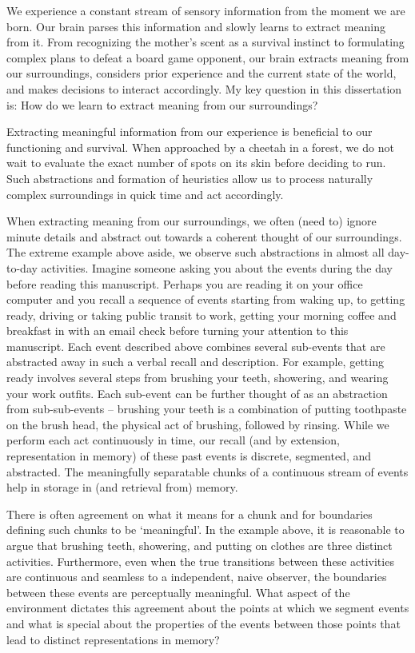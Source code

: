 We experience a constant stream of sensory information from the moment we are born. Our brain parses this information and slowly learns to extract meaning from it. From recognizing the mother's scent as a survival instinct to formulating complex plans to defeat a board game opponent, our brain extracts meaning from our surroundings, considers prior experience and the current state of the world, and makes decisions to interact accordingly. My key question in this dissertation is: How do we learn to extract meaning from our surroundings?

Extracting meaningful information from our experience is beneficial to our functioning and survival. When approached by a cheetah in a forest, we do not wait to evaluate the exact number of spots on its skin before deciding to run. Such abstractions and formation of heuristics allow us to process naturally complex surroundings in quick time and act accordingly.

When extracting meaning from our surroundings, we often (need to) ignore minute details and abstract out towards a coherent thought of our surroundings. The extreme example above aside, we observe such abstractions in almost all day-to-day activities. Imagine someone asking you about the events during the day before reading this manuscript. Perhaps you are reading it on your office computer and you recall a sequence of events starting from waking up, to getting ready, driving or taking public transit to work, getting your morning coffee and breakfast in with an email check before turning your attention to this manuscript. Each event described above combines several sub-events that are abstracted away in such a verbal recall and description. For example, getting ready involves several steps from brushing your teeth, showering, and wearing your work outfits. Each sub-event can be further thought of as an abstraction from sub-sub-events -- brushing your teeth is a combination of putting toothpaste on the brush head, the physical act of brushing, followed by rinsing. While we perform each act continuously in time, our recall (and by extension, representation in memory) of these past events is discrete, segmented, and abstracted. The meaningfully separatable chunks of a continuous stream of events help in storage in (and retrieval from) memory.

There is often agreement on what it means for a chunk and for boundaries defining such chunks to be `meaningful'. In the example above, it is reasonable to argue that brushing teeth, showering, and putting on clothes are three distinct activities. Furthermore, even when the true transitions between these activities are continuous and seamless to a  independent, naive observer, the boundaries between these events are perceptually meaningful. What aspect of the environment dictates this agreement about the points at which we segment events and what is special about the properties of the events between those points that lead to distinct representations in memory?

